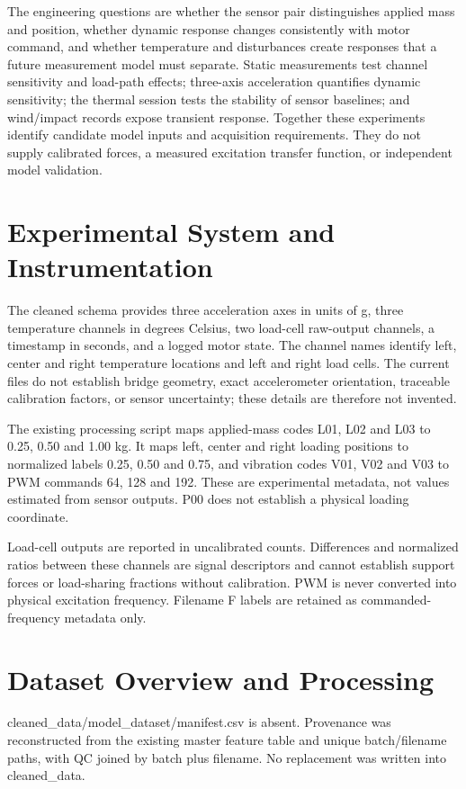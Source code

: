 \documentclass[10pt,letterpaper]{article}
\begin{document}
The engineering questions are whether the sensor pair distinguishes applied mass and position, whether dynamic response changes consistently with motor command, and whether temperature and disturbances create responses that a future measurement model must separate. Static measurements test channel sensitivity and load-path effects; three-axis acceleration quantifies dynamic sensitivity; the thermal session tests the stability of sensor baselines; and wind/impact records expose transient response. Together these experiments identify candidate model inputs and acquisition requirements. They do not supply calibrated forces, a measured excitation transfer function, or independent model validation.

\section{Experimental System and Instrumentation}
The cleaned schema provides three acceleration axes in units of g, three temperature channels in degrees Celsius, two load-cell raw-output channels, a timestamp in seconds, and a logged motor state. The channel names identify left, center and right temperature locations and left and right load cells. The current files do not establish bridge geometry, exact accelerometer orientation, traceable calibration factors, or sensor uncertainty; these details are therefore not invented.

The existing processing script maps applied-mass codes L01, L02 and L03 to 0.25, 0.50 and 1.00 kg. It maps left, center and right loading positions to normalized labels 0.25, 0.50 and 0.75, and vibration codes V01, V02 and V03 to PWM commands 64, 128 and 192. These are experimental metadata, not values estimated from sensor outputs. P00 does not establish a physical loading coordinate.

Load-cell outputs are reported in uncalibrated counts. Differences and normalized ratios between these channels are signal descriptors and cannot establish support forces or load-sharing fractions without calibration. PWM is never converted into physical excitation frequency. Filename F labels are retained as commanded-frequency metadata only.

\section{Dataset Overview and Processing}
cleaned\_data/model\_dataset/manifest.csv is absent. Provenance was reconstructed from the existing master feature table and unique batch/filename paths, with QC joined by batch plus filename. No replacement was written into cleaned\_data.
\end{document}
